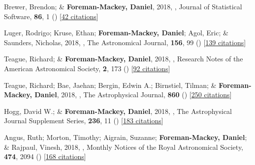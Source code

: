 \item[{\color{numcolor}\scriptsize38}] Brewer, Brendon; \& \textbf{Foreman-Mackey, Daniel}, 2018, , Journal of Statistical Software, \textbf{86}, 1 () [\href{https://scholar.google.com/scholar?cites=789224875040810871}{42 citations}]

\item[{\color{numcolor}\scriptsize37}] Luger, Rodrigo; Kruse, Ethan; \textbf{Foreman-Mackey, Daniel}; Agol, Eric; \& Saunders, Nicholas, 2018, , The Astronomical Journal, \textbf{156}, 99 () [\href{https://ui.adsabs.harvard.edu/abs/2018AJ....156...99L}{139 citations}]

\item[{\color{numcolor}\scriptsize36}] Teague, Richard; \& \textbf{Foreman-Mackey, Daniel}, 2018, , Research Notes of the American Astronomical Society, \textbf{2}, 173 () [\href{https://ui.adsabs.harvard.edu/abs/2018RNAAS...2..173T}{92 citations}]

\item[{\color{numcolor}\scriptsize35}] Teague, Richard; Bae, Jaehan; Bergin, Edwin A.; Birnstiel, Tilman; \& \textbf{Foreman-Mackey, Daniel}, 2018, , The Astrophysical Journal, \textbf{860} () [\href{https://ui.adsabs.harvard.edu/abs/2018ApJ...860L..12T}{250 citations}]

\item[{\color{numcolor}\scriptsize34}] Hogg, David W.; \& \textbf{Foreman-Mackey, Daniel}, 2018, , The Astrophysical Journal Supplement Series, \textbf{236}, 11 () [\href{https://ui.adsabs.harvard.edu/abs/2018ApJS..236...11H}{183 citations}]

\item[{\color{numcolor}\scriptsize33}] Angus, Ruth; Morton, Timothy; Aigrain, Suzanne; \textbf{Foreman-Mackey, Daniel}; \& Rajpaul, Vinesh, 2018, , Monthly Notices of the Royal Astronomical Society, \textbf{474}, 2094 () [\href{https://ui.adsabs.harvard.edu/abs/2018MNRAS.474.2094A}{168 citations}]

